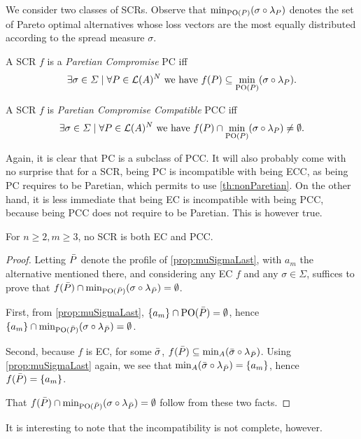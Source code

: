 \documentclass[version=3.21, pagesize, twoside=off, bibliography=totoc, DIV=calc, fontsize=12pt, a4paper]{scrartcl}
\begin{document}
We consider two classes of \acp{SCR}. 
Observe that $\mustar$ denotes the set of Pareto optimal alternatives whose loss vectors are the most equally distributed according to the spread measure $\sigma$.

\begin{definition} A \ac{SCR} $f$ is a \emph{Paretian Compromise} PC iff \[\exists \sigma \in \Sigma \suchthat \forall P \in \linors^N \text{ we have } f(P) \subseteq \mustar.\]
\end{definition}

\begin{definition} A \ac{SCR} $f$ is \emph{Paretian Compromise Compatible} PCC iff \[\exists \sigma \in \Sigma \suchthat \forall P \in \linors^N \text{ we have } f(P) \cap \mustar \neq \emptyset.\]
\end{definition}

Again, it is clear that PC is a subclass of PCC. It will also probably come with no surprise that for a \ac{SCR}, being PC is incompatible with being ECC, as being PC requires to be Paretian, which permits to use \cref{th:nonParetian}. On the other hand, it is less immediate that being EC is incompatible with
being PCC, because being PCC does not require to be Paretian. This is however true.

\begin{theorem} \label{th:incompatibility} 
	For $n ≥ 2, m ≥ 3$, no \ac{SCR} is both EC and PCC.
\end{theorem}
\begin{proof}	
	Letting $\bar{P}$   denote the profile of \cref{prop:muSigmaLast}, with $a_m$ the alternative mentioned there, and considering any EC $f$ and any $\sigma \in \Sigma$, suffices to prove that $f(\Ptop) \cap {\mustar[\sigma][\Ptop]} = \emptyset$.
	
	First, from \cref{prop:muSigmaLast}, $\{a_m\} \cap \text{PO}(\bar{P}) = \emptyset$, hence $\set{a_m} \cap {\mustar[\sigma][\Ptop]} = \emptyset$. 
	
	Second, because $f$ is EC, for some $\bar{\sigma}$, $f(\Ptop) \subseteq {\musigma[\sigmatop][\Ptop]}$. Using \cref{prop:muSigmaLast} again, we see that ${\musigma[\sigmatop][\Ptop]} = \set{a_m}$, hence $f(\bar{P}) = \{a_m\}$.
	
	That $f(\Ptop) \cap {\mustar[\sigma][\Ptop]} = \emptyset$ follow from these two facts.
\end{proof}

It is interesting to note that the incompatibility is not complete, however.
\end{document}
